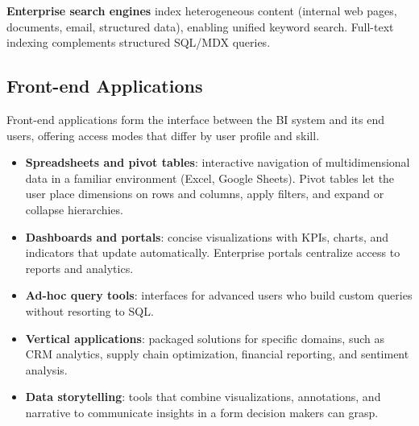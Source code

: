 \begin{theorybox}
\textbf{Enterprise search engines} index heterogeneous content (internal web pages, documents, email, structured data), enabling unified keyword search. Full-text indexing complements structured SQL/MDX queries.
\end{theorybox}

\subsection{Front-end Applications}
\label{sec:frontend}

Front-end applications form the interface between the BI system and its end users, offering access modes that differ by user profile and skill.

\begin{itemize}
    \item \textbf{Spreadsheets and pivot tables}: interactive navigation of multidimensional data in a familiar environment (Excel, Google Sheets). Pivot tables let the user place dimensions on rows and columns, apply filters, and expand or collapse hierarchies.
    \item \textbf{Dashboards and portals}: concise visualizations with KPIs, charts, and indicators that update automatically. Enterprise portals centralize access to reports and analytics.
    \item \textbf{Ad-hoc query tools}: interfaces for advanced users who build custom queries without resorting to SQL.
    \item \textbf{Vertical applications}: packaged solutions for specific domains, such as CRM analytics, supply chain optimization, financial reporting, and sentiment analysis.
    \item \textbf{Data storytelling}: tools that combine visualizations, annotations, and narrative to communicate insights in a form decision makers can grasp.
\end{itemize}
